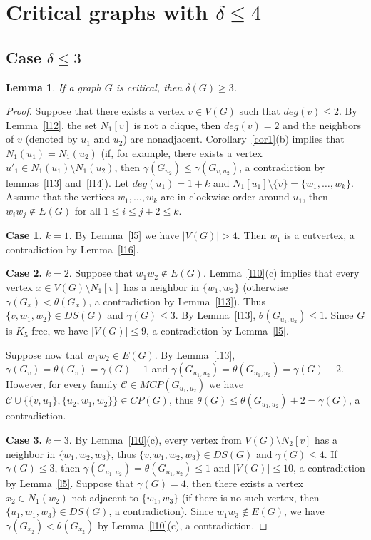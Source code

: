 \documentclass[12pt]{article}
\newtheorem{lemma}{Lemma}
\begin{document}
\section{Critical graphs with $\delta \leq 4$}

\subsection{Case $\delta \leq 3$}

\begin{lemma}\label{l18}
If a graph $G$ is critical, then $\delta(G) \geq 3$.
\end{lemma}

\begin{proof}
Suppose that there exists a vertex $v \in V(G)$ such that $deg(v) \leq 2$. By Lemma~\ref{l12}, the set $N_1[v]$ is not a clique, then  $deg(v) = 2$ and the neighbors of $v$ (denoted by $u_1$ and $u_2$) are nonadjacent. Corollary~\ref{cor1}(b) implies that $N_1(u_1) = N_1(u_2)$ (if, for example, there exists a vertex $u'_1 \in N_1(u_1) \setminus N_1(u_2)$, then $\gamma(G_{u_2}) \leq \gamma(G_{v,u_2})$, a contradiction by lemmas~\ref{l13} and~\ref{l14}). Let $deg(u_1) = 1 + k$ and $N_1[u_1] \setminus \{v\} = \{w_1,\ldots,w_k\}$. Assume that the vertices $w_1,\ldots,w_k$ are in clockwise order around $u_1$, then $w_iw_j \notin E(G)$ for all $1 \leq i \leq j + 2 \leq k$.

\textbf{Case 1.} $k = 1$. By Lemma~\ref{l5} we have $|V(G)| > 4$. Then $w_1$ is a cutvertex, a contradiction by Lemma~\ref{l16}.

\textbf{Case 2.} $k = 2$. Suppose that $w_1w_2 \notin E(G)$. Lemma~\ref{l10}(c) implies that every vertex $x \in V(G) \setminus N_1[v]$ has a neighbor in $\{w_1,w_2\}$ (otherwise $\gamma(G_x) < \theta(G_x)$, a contradiction by Lemma~\ref{l13}). Thus $\{v,w_1,w_2\} \in DS(G)$ and $\gamma(G) \leq 3$. By Lemma~\ref{l13}, $\theta(G_{u_1,u_2}) \leq 1$. Since $G$ is $K_5$-free, we have $|V(G)| \leq 9$, a contradiction by Lemma~\ref{l5}. 

Suppose now that $w_1w_2 \in E(G)$. By Lemma~\ref{l13}, $\gamma(G_v) = \theta(G_v) = \gamma(G) - 1$ and $\gamma(G_{u_1,u_2}) = \theta(G_{u_1,u_2}) = \gamma(G) - 2$. However, for every family $\mathcal{C} \in MCP(G_{u_1,u_2})$ we have $\mathcal{C} \cup \{\{v,u_1\},\{u_2,w_1,w_2\}\} \in CP(G)$, thus $\theta(G) \leq \theta(G_{u_1,u_2}) + 2 = \gamma(G)$, a contradiction.

\textbf{Case 3.} $k = 3$. By Lemma~\ref{l10}(c), every vertex from $V(G) \setminus N_2[v]$ has a neighbor in $\{w_1,w_2,w_3\}$, thus $\{v,w_1,w_2,w_3\} \in DS(G)$ and $\gamma(G) \leq 4$. If $\gamma(G) \leq 3$, then $\gamma(G_{u_1,u_2}) = \theta(G_{u_1,u_2}) \leq 1$ and $|V(G)| \leq 10$, a contradiction by Lemma~\ref{l5}. Suppose that $\gamma(G) = 4$, then there exists a vertex $x_2 \in N_1(w_2)$ not adjacent to $\{w_1,w_3\}$ (if there is no such vertex, then $\{u_1,w_1,w_3\} \in DS(G)$, a contradiction). Since $w_1w_3 \notin E(G)$, we have $\gamma(G_{x_2}) < \theta(G_{x_2})$ by Lemma~\ref{l10}(c), a contradiction.


\end{proof}
\end{document}
